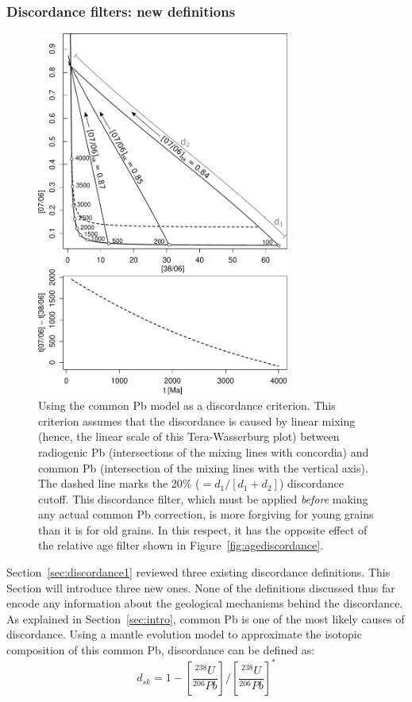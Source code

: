 \documentclass[gchron, manuscript]{copernicus}
\begin{document}
\subsubsection{Discordance filters: new definitions}\label{sec:discordance2}

\begin{figure}
  \includegraphics[width=8.3cm]{TW-option-linear-3.pdf}
    \caption{Using the \citet{stacey1975} common Pb model as a
      discordance criterion. This criterion assumes that the
      discordance is caused by linear mixing (hence, the linear scale
      of this Tera-Wasserburg plot) between radiogenic Pb
      (intersections of the mixing lines with concordia) and common Pb
      (intersection of the mixing lines with the vertical axis). The
      dashed line marks the 20\% ($= d_1/[d_1+d_2]$) discordance
      cutoff. This discordance filter, which must be applied
      \emph{before} making any actual common Pb correction, is more
      forgiving for young grains than it is for old grains. In this
      respect, it has the opposite effect of the relative age filter
      shown in Figure~\ref{fig:agediscordance}.
    }
    \label{fig:SK}
\end{figure}

Section~\ref{sec:discordance1} reviewed three existing discordance
definitions.  This Section will introduce three new ones.  None of the
definitions discussed thus far encode any information about the
geological mechanisms behind the discordance. As explained in
Section~\ref{sec:intro}, common Pb is one of the most likely causes of
discordance. Using a mantle evolution model \citep[e.g.][]{stacey1975}
to approximate the isotopic composition of this common Pb, discordance
can be defined as:
\begin{equation}
  d_{sk} = 1 - \left[\frac{{}^{238}U}{{}^{206}Pb}\right]\bigg/\left[\frac{{}^{238}U}{{}^{206}Pb}\right]^\ast
  \label{eq:dsk}
\end{equation}
\end{document}
